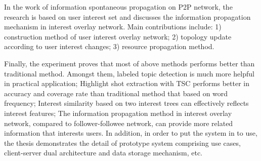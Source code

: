 \begin{eabstract}
In the work of information spontaneous propagation on P2P network, the research is based on user interest set and discusses the information propagation mechanism in interest overlay network. Main contributions include: 1) construction method of user interest overlay network; 2) topology update according to user interest changes; 3) resource propagation method.

Finally, the experiment proves that most of above methods performs better than traditional method. Amongst them, labeled topic detection is much more helpful in practical application; Highlight shot extraction with TSC performs better in accuracy and coverage rate than traditional method that based on word frequency; Interest similarity based on two interest trees can effectively reflects interest features; The information propagation method in interest overlay network, compared to follower-followee network, can provide more related information that interests users. In addition, in order to put the system in to use, the thesis demonstrates the detail of prototype system comprising use cases, client-server dual architecture and data storage mechanism, etc.

\end{eabstract}
